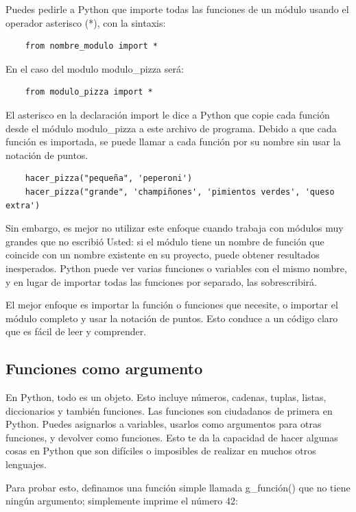 Puedes pedirle a Python que importe todas las funciones de un módulo usando el operador asterisco {\ttfamily (*)}, con la sintaxis:

\begin{lstlisting}
	from nombre_modulo import *
\end{lstlisting}

En el caso del modulo {\ttfamily modulo\_pizza} será:

\begin{lstlisting}
	from modulo_pizza import *
\end{lstlisting}

El asterisco en la declaración {\ttfamily import} le dice a Python que copie cada función
desde el módulo {\ttfamily modulo\_pizza} a este archivo de programa. Debido a que cada función es importada, se puede llamar a cada función por su nombre sin usar la notación de puntos. 

\begin{lstlisting}
	hacer_pizza("pequeña", 'peperoni')
	hacer_pizza("grande", 'champiñones', 'pimientos verdes', 'queso extra')
\end{lstlisting}

Sin embargo, es mejor no utilizar este enfoque cuando trabaja con módulos muy grandes que no escribió Usted:
si el módulo tiene un nombre de función que coincide con un nombre existente en su proyecto, puede obtener resultados inesperados. Python puede ver varias funciones o variables con el mismo nombre, y en lugar de importar todas las funciones por separado, las sobrescribirá. 

El mejor enfoque es importar la función o funciones que necesite, o importar el módulo completo y usar la notación de puntos. Esto conduce a un código claro que es fácil de leer y comprender. 


\subsection{Funciones como argumento}

En  Python, todo es un objeto. Esto incluye números, cadenas, tuplas, listas, diccionarios y también funciones. Las funciones son ciudadanos de primera en Python. Puedes asignarlos a variables, usarlos como argumentos para otras funciones, y devolver como funciones. Esto te da la capacidad de hacer algunas cosas en Python que son difíciles o imposibles de realizar en muchos otros lenguajes.

Para probar esto, definamos una función simple llamada  {\ttfamily g\_función()} que no tiene ningún argumento;
simplemente imprime el número 42:

